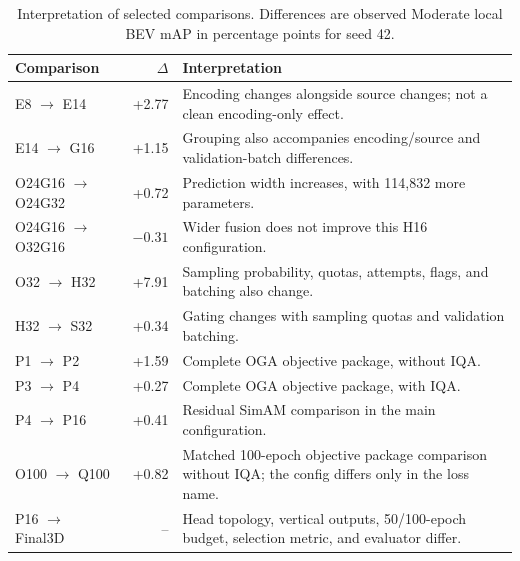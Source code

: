 \documentclass[10pt]{article}
\begin{document}
\begin{table}[htbp]
\centering\small\setlength{\tabcolsep}{5pt}
\caption{Saved model size and runtime for all 23 BEV runs, with their individual budgets. Selected is the evaluated checkpoint epoch. Timing is FP32 on an L4, and pipeline denotes offline input-to-detections. Final3D has 797,382 parameters and no saved stage latency.}
\label{tab:allruntime}

\end{table}

\begin{table}[htbp]
\centering\small
\caption{Interpretation of selected comparisons. Differences are observed Moderate local BEV mAP in percentage points for seed 42.}
\label{tab:limits}
\begin{tabular}{lrp{10.4cm}}
\toprule Comparison & $\Delta$ & Interpretation \\
\midrule
E8 $\to$ E14 & +2.77 & Encoding changes alongside source changes; not a clean encoding-only effect. \\
E14 $\to$ G16 & +1.15 & Grouping also accompanies encoding/source and validation-batch differences. \\
O24G16 $\to$ O24G32 & +0.72 & Prediction width increases, with 114,832 more parameters. \\
O24G16 $\to$ O32G16 & $-0.31$ & Wider fusion does not improve this H16 configuration. \\
O32 $\to$ H32 & +7.91 & Sampling probability, quotas, attempts, flags, and batching also change. \\
H32 $\to$ S32 & +0.34 & Gating changes with sampling quotas and validation batching. \\
P1 $\to$ P2 & +1.59 & Complete OGA objective package, without IQA. \\
P3 $\to$ P4 & +0.27 & Complete OGA objective package, with IQA. \\
P4 $\to$ P16 & +0.41 & Residual SimAM comparison in the main configuration. \\
O100 $\to$ Q100 & +0.82 & Matched 100-epoch objective package comparison without IQA; the config differs only in the loss name. \\
P16 $\to$ Final3D & -- & Head topology, vertical outputs, 50/100-epoch budget, selection metric, and evaluator differ. \\
\bottomrule
\end{tabular}
\end{table}

\begin{table}[htbp]
\centering\small
\caption{AP-selected versus loss-selected local BEV checkpoints. AP score and Loss score are Moderate mAP (\%); the difference is AP minus loss in percentage points. O100/Q100 complete 100 epochs; other rows complete 50. Four decimal places in the difference retain O100's small off-grid advantage for loss selection.}
\label{tab:checkpoint}

\end{table}
\end{document}
